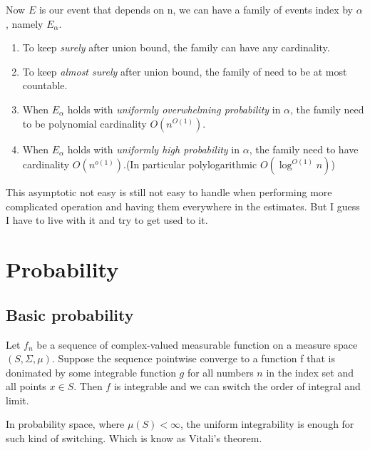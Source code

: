 \begin{proposition}
    Now $E$ is our event that depends on n, we can have a family of events index by $\alpha$, namely $E_\alpha$.
    \begin{enumerate}
        \item To keep \textit{surely} after union bound, the family can have any cardinality.
        \item To keep \textit{almost surely} after union bound, the family of need to be at most countable.
        \item When $E_\alpha$ holds with \textit{uniformly overwhelming probability} in $\alpha$, the family need to be polynomial cardinality $O(n^{O(1)})$.
        \item When $E_\alpha$ holds with \textit{uniformly high probability} in $\alpha$, the family need to have cardinality $O(n^{o(1)})$.(In particular polylogarithmic $O(\log^{O(1)}n)$)
    \end{enumerate}

\end{proposition}

This asymptotic not easy is still not easy to handle when performing more complicated operation and having them everywhere in the estimates. 
But I guess I have to live with it and try to get used to it.


\section{Probability}

\subsection{Basic probability}

\begin{theorem}\label{dominate convergence theorem}
    Let $f_n$ be a sequence of complex-valued measurable function on a measure space $(S,\Sigma,\mu)$. 
    Suppose the sequence pointwise converge to a function f that is donimated by some integrable function $g$ for all numbers $n$ in the index set and all points $x\in S$. 
    Then $f$ is integrable and we can switch the order of integral and limit.
\end{theorem}
\begin{remark}
    In probability space, where $\mu(S)<\infty$, the uniform integrability is enough for such kind of switching. Which is know as Vitali's theorem.
\end{remark}

